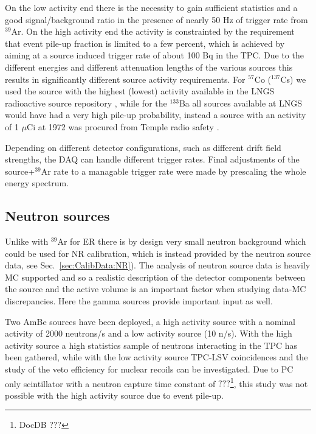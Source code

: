 On the low activity end there is the necessity to gain sufficient statistics and a good signal/background ratio in the presence of nearly 50 Hz of trigger rate from $^{39}$Ar. On the high activity end the activity is constrainted by the requirement that event pile-up fraction is limited to a few percent, which is achieved by aiming at a source induced trigger rate of about 100 Bq in the TPC. Due to the different energies and different attenuation lengths of the various sources this results in significantly different source activity requirements. For $^{57}$Co ($^{137}$Cs) we used the source with the highest (lowest) activity available in the LNGS radioactive source repository \cite{LNGS:radioactivesourcelist}, while for the $^{133}$Ba all sources available at LNGS would have had a very high pile-up probability, instead a source with an activity of  1 $\mu$Ci at 1972 was procured from Temple radio safety \cite{Jeff:Ba133:privComm}.

Depending on different detector configurations, such as different drift field strengths, the DAQ can handle different trigger rates. Final adjustments of the source+$^{39}$Ar rate to a managable trigger rate were made by prescaling the whole energy spectrum.



\subsection{Neutron sources}
Unlike with $^{39}$Ar for ER there is by design very small neutron background which could be used for NR calibration, which is instead provided by the neutron source data, see Sec.~\ref{sec:CalibData:NR}). The analysis of neutron source data is heavily MC supported and so a realistic description of the detector components between the source and the active volume is an important factor when studying data-MC discrepancies. Here the gamma sources provide important input as well.

Two AmBe sources have been deployed, a high activity source with a nominal activity of 2000 neutrons/s and a low activity source (10 n/s). With the high activity source a high statistics sample of neutrons interacting in the TPC has been gathered, while with the low activity source TPC-LSV coincidences  and the study of the veto efficiency for nuclear recoils can be investigated. Due to PC only scintillator with a neutron capture time constant of $???$\footnote{DocDB ???}, this study was not possible with the high activity source due to event pile-up.




